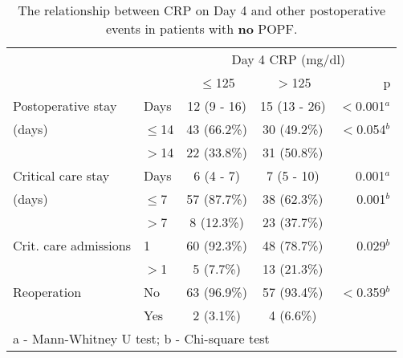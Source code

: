 \begin{table}[p]
	\centering
	\caption{The relationship between CRP on Day 4 and other postoperative events in patients with \textbf{no} POPF.}
	\label{table:crp_comp_CRP4_vs_LOS}
	\renewcommand{\arraystretch}{1.2} %
	\begin{tabular}{|l l | c c r |}
		\hline
		                      &          &  \multicolumn{3}{c|}{Day 4 CRP (mg/dl)}   \\
		                      &          & $\leq$125   & $>$125       & p            \\ \hline
		Postoperative stay    & Days     & 12 (9 - 16) & 15 (13 - 26) & $<$0.001$^a$ \\
		(days)                & $\leq$14 & 43 (66.2\%) & 30 (49.2\%)  & $<$0.054$^b$ \\
		                      & $>$14    & 22 (33.8\%) & 31 (50.8\%)  &  \\
		Critical care stay    & Days     & 6 (4 - 7)   & 7 (5 - 10)   & 0.001$^a$    \\
		(days)                & $\leq$7  & 57 (87.7\%) & 38 (62.3\%)  & 0.001$^b$    \\
		                      & $>$7     & 8 (12.3\%)  & 23 (37.7\%)  &  \\
		Crit. care admissions & 1        & 60 (92.3\%) & 48 (78.7\%)  & 0.029$^b$    \\
		                      & $>$1     & 5 (7.7\%)   & 13 (21.3\%)  &  \\
		Reoperation           & No       & 63 (96.9\%) & 57 (93.4\%)  & $<$0.359$^b$ \\
		                      & Yes      & 2 (3.1\%)   & 4 (6.6\%)    &  \\ \hline
		\multicolumn{5}{l}{a - Mann-Whitney U test; b - Chi-square test}
	\end{tabular}
\end{table}



